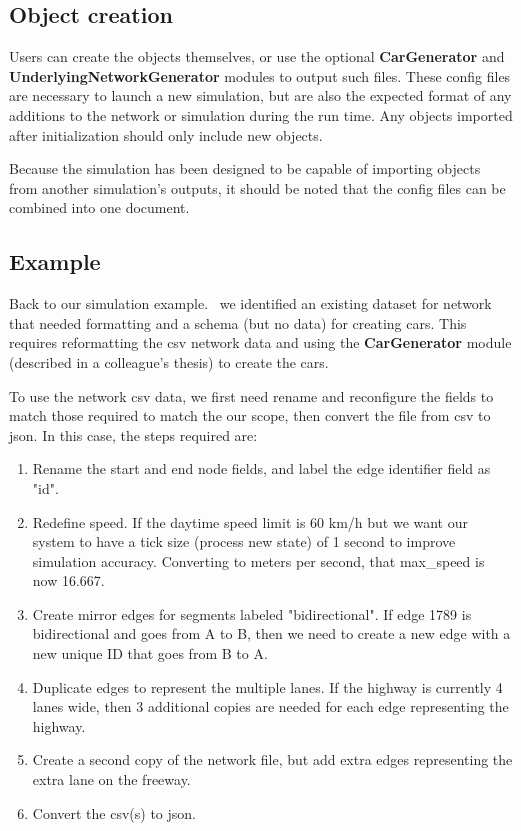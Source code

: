 \subsection{Object creation}

\par Users can create the objects themselves, or use the optional \textbf{CarGenerator} and \textbf{UnderlyingNetworkGenerator} modules to output such files. These config files are necessary to launch a new simulation, but are also the expected format of any additions to the network or simulation during the run time.  Any objects imported after initialization should only include new objects.\\

\par Because the simulation has been designed to be capable of importing objects from another simulation's outputs, it should be noted that the config files can be combined into one document.


\subsection{Example}
 \par  Back to our simulation example. \ we identified an existing dataset for network that needed formatting and a schema (but no data) for creating cars.  This requires reformatting the csv network data and using the \textbf{CarGenerator} module (described in a colleague's thesis) to create the cars. \\
 
\par To use the network csv data, we first need rename and reconfigure the fields to match those required to match the our scope, then convert the file from csv to json.  In this case, the steps required are:

\begin{enumerate}
    \item Rename the start and end node fields, and label the edge identifier field as "id". 
    \item Redefine speed.  If the daytime speed limit is 60 km/h but we want our system to have a tick size (process new state) of 1 second to improve simulation accuracy.  Converting to meters per second, that max\_speed is now 16.667.
    \item Create mirror edges for segments labeled "bidirectional".  If edge 1789 is bidirectional and goes from A to B, then we need to create a new edge with a new unique ID that goes from B to A.
    \item Duplicate edges to represent the multiple lanes.  If the highway is currently 4 lanes wide, then 3 additional copies are needed for each edge representing the highway.
    \item Create a second copy of the network file, but add extra edges representing the extra lane on the freeway.
    \item Convert the csv(s) to json.
\end{enumerate}


